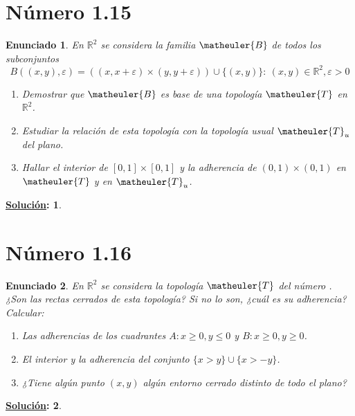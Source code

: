 \documentclass[10pt,a4paper,openright]{book}
\theoremstyle{break}
\newtheorem*{enun}{Enunciado}
\newtheorem*{sol}{\underline{Solución}:}
\begin{document}
\section*{Número 1.15}
\begin{enun}
En $\mathbb{R}^2$ se considera la familia $\matheuler{B}$ de todos los subconjuntos $$B((x,y), \varepsilon) = ((x,x+\varepsilon) \times (y,y + \varepsilon)) \cup \{(x,y)\} : \  (x,y) \in \mathbb{R}^2, \varepsilon > 0$$
\begin{enumerate}[label={(\arabic*)}]
\item Demostrar que $\matheuler{B}$ es base de una topología $\matheuler{T}$ en $\mathbb{R}^2$.
\item Estudiar la relación de esta topología con la topología usual $\matheuler{T}_{u}$ del plano.
\item Hallar el interior de $[0,1] \times [0,1]$ y la adherencia de $(0,1) \times (0,1)$ en $\matheuler{T}$ y en $\matheuler{T}_u$.
\end{enumerate}
\end{enun}
\begin{sol}
\end{sol}

\section*{Número 1.16}
\begin{enun}
En $\mathbb{R}^2$ se considera la topología $\matheuler{T}$ del número {}. ¿Son las rectas cerrados de esta topología? Si no lo son, ¿cuál es su adherencia? Calcular:
\begin{enumerate}[label={(\arabic*)}]
\item Las adherencias de los cuadrantes $A: x \geq 0, y \leq 0$ y $B: x \geq 0, y \geq 0$.
\item El interior y la adherencia del conjunto $\{x > y\}\cup\{x > -y\}$.
\item ¿Tiene algún punto $(x,y)$ algún entorno cerrado distinto de todo el plano?
\end{enumerate}
\end{enun}
\begin{sol}
\end{sol}
\end{document}
